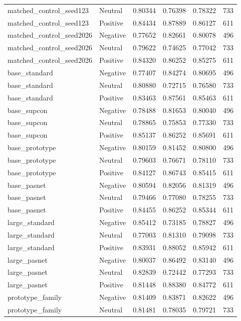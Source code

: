 \begin{tabular}{llrrrr}
matched\_control\_seed123 & Neutral & 0.80344 & 0.76398 & 0.78322 & 733 \\
matched\_control\_seed123 & Positive & 0.84434 & 0.87889 & 0.86127 & 611 \\
matched\_control\_seed2026 & Negative & 0.77652 & 0.82661 & 0.80078 & 496 \\
matched\_control\_seed2026 & Neutral & 0.79622 & 0.74625 & 0.77042 & 733 \\
matched\_control\_seed2026 & Positive & 0.84320 & 0.86252 & 0.85275 & 611 \\
base\_standard & Negative & 0.77407 & 0.84274 & 0.80695 & 496 \\
base\_standard & Neutral & 0.80880 & 0.72715 & 0.76580 & 733 \\
base\_standard & Positive & 0.83463 & 0.87561 & 0.85463 & 611 \\
base\_supcon & Negative & 0.78488 & 0.81653 & 0.80040 & 496 \\
base\_supcon & Neutral & 0.78865 & 0.75853 & 0.77330 & 733 \\
base\_supcon & Positive & 0.85137 & 0.86252 & 0.85691 & 611 \\
base\_prototype & Negative & 0.80159 & 0.81452 & 0.80800 & 496 \\
base\_prototype & Neutral & 0.79603 & 0.76671 & 0.78110 & 733 \\
base\_prototype & Positive & 0.84127 & 0.86743 & 0.85415 & 611 \\
base\_pasnet & Negative & 0.80594 & 0.82056 & 0.81319 & 496 \\
base\_pasnet & Neutral & 0.79466 & 0.77080 & 0.78255 & 733 \\
base\_pasnet & Positive & 0.84455 & 0.86252 & 0.85344 & 611 \\
large\_standard & Negative & 0.85412 & 0.73185 & 0.78827 & 496 \\
large\_standard & Neutral & 0.77003 & 0.81310 & 0.79098 & 733 \\
large\_standard & Positive & 0.83931 & 0.88052 & 0.85942 & 611 \\
large\_pasnet & Negative & 0.80037 & 0.86492 & 0.83140 & 496 \\
large\_pasnet & Neutral & 0.82839 & 0.72442 & 0.77293 & 733 \\
large\_pasnet & Positive & 0.81448 & 0.88380 & 0.84772 & 611 \\
prototype\_family & Negative & 0.81409 & 0.83871 & 0.82622 & 496 \\
prototype\_family & Neutral & 0.81481 & 0.78035 & 0.79721 & 733 \\

\end{tabular}
